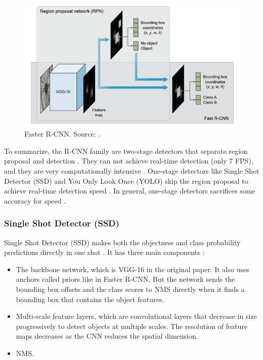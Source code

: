 \documentclass[a4paper, 11pt, oneside]{article}
\begin{document}
  \begin{figure}[ht]
    \begin{center}
      \includegraphics[width=.8\textwidth]{faster_r_cnn.png}
    \end{center}
    \caption{Faster R-CNN. Source: \cite{elgendy2020deep}.}
  \end{figure}

  To summarize, the R-CNN family are two-stage detectors that separate region proposal and detection
  \cite{elgendy2020deep, liu2020deep}. They can not achieve real-time detection (only 7 FPS), and they are very
  computationally intensive \cite{elgendy2020deep, liu2016ssd, redmon2016you}.
  One-stage detectors like Single Shot Detector (SSD) and You Only Look Once (YOLO) skip the region proposal to achieve
  real-time detection speed \cite{elgendy2020deep}. In general, one-stage detectors sacrifices some accuracy for speed
  \cite{elgendy2020deep, lin2017focal}.

  \subsubsection{Single Shot Detector (SSD)}

  Single Shot Detector (SSD) makes both the objectness and class probability predictions directly in one shot
  \cite{elgendy2020deep, liu2016ssd}. It has three main components \cite{elgendy2020deep, liu2016ssd}:

  \begin{itemize}
    \item The backbone network, which is VGG-16 in the original paper. It also uses anchors called priors like in Faster R-CNN.
    But the network sends the bounding box offsets and the class scores to NMS directly when it finds a bounding box that
    contains the object features.
    \item Multi-scale feature layers, which are convolutional layers that decrease in size progressively to detect objects
    at multiple scales. The resolution of feature maps decreases as the CNN reduces the spatial dimension.
    \item NMS.
  \end{itemize}
\end{document}
